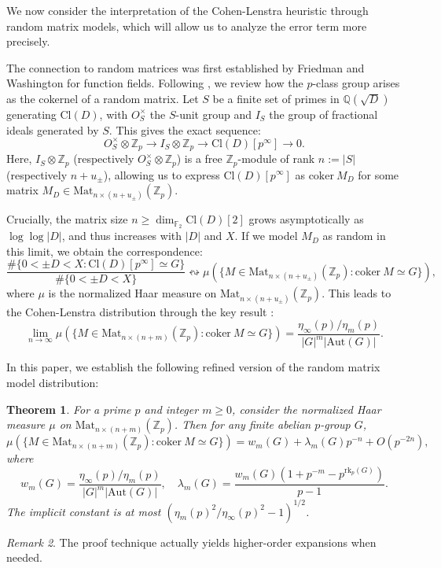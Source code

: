 \documentclass[a4]{amsart}
\newcommand{\Mat}{{\mathrm{Mat}}}
\newcommand{\Aut}{{\mathrm{Aut}}}
\newcommand{\rk}{\mathrm{rk}}
\newcommand{\Cl}{\mathrm{Cl}}
\newcommand{\coker}{\mathrm{coker~}}
\newcommand{\BF}{{\mathbb {F}}}
\newcommand{\BQ}{{\mathbb {Q}}}
\newcommand{\BZ}{{\mathbb {Z}}}
\newtheorem{theorem}{Theorem}
\theoremstyle{remark} \newtheorem{remark}[theorem]{Remark}
\begin{document}
\smallskip
We now consider the interpretation of the Cohen-Lenstra heuristic through random matrix models, which will allow us to analyze the error term more precisely.

The connection to random matrices was first established by Friedman and Washington \cite{friedman1989Distribution} for function fields. Following \cite{wood2019Random, venkatesh2011Statistics}, we review how the $p$-class group arises as the cokernel of a random matrix. Let $S$ be a finite set of primes in $\BQ(\sqrt{D})$ generating $\Cl(D)$, with $O_S^\times$ the $S$-unit group and $I_S$ the group of fractional ideals generated by $S$. This gives the exact sequence:
\[
O_S^\times\otimes \BZ_p \rightarrow I_S\otimes \BZ_p \rightarrow \Cl(D)[p^\infty] \rightarrow 0.
\]
Here, $I_S\otimes \BZ_p$ (respectively $O_S^\times\otimes \BZ_p$) is a free $\BZ_p$-module of rank $n:=|S|$ (respectively $n+u_\pm$), allowing us to express $\Cl(D)[p^\infty]$ as $\coker M_D$ for some matrix $M_D\in \Mat_{n\times (n+u_\pm)}(\BZ_p)$.

Crucially, the matrix size $n \geq \dim_{\BF_2}\Cl(D)[2]$ grows asymptotically as $\log\log |D|$, and thus increases with $|D|$ and $X$. 
If we model $M_D$ as random in this limit, we obtain the correspondence:
\begin{equation}\label{equ:cor}
\frac{\#\{0<\pm D<X: \Cl(D)[p^\infty]\simeq G\}}{\#\{0<\pm D<X\}} \leftrightsquigarrow \mu\left(\{M\in \Mat_{n\times (n+u_\pm)}(\BZ_p) : \coker M\simeq G\}\right), \tag{$\ast$}
\end{equation}
where $\mu$ is the normalized Haar measure on $\Mat_{n\times(n+u_{\pm})}(\BZ_p)$. 
This leads to the Cohen-Lenstra distribution through the key result \cite{friedman1989Distribution, wood2019Random}:
\[
\lim_{n\to \infty}\mu\left(\{M\in \Mat_{n\times (n+m)}(\BZ_p) : \coker M\simeq G\}\right) = \frac{\eta_\infty(p)/\eta_{m}(p)}{|G|^{m}|\Aut(G)|}.
\]

 

\bigskip
In this paper, we establish the following refined version of the random matrix model distribution:
\begin{theorem}\label{thm:main_thm0}
For a prime $p$ and integer $m \geq 0$, consider the normalized Haar measure $\mu$ on $\Mat_{n\times(n+m)}(\BZ_p)$. Then for any finite abelian $p$-group $G$,
\[
\mu\left(\{M \in \Mat_{n\times(n+m)}(\BZ_p) : \coker M \simeq G\}\right) = w_m(G) + \lambda_m(G)p^{-n} + O(p^{-2n}),
\]
where 
\[
w_m(G) = \frac{\eta_\infty(p)/\eta_m(p)}{|G|^m|\Aut(G)|}, \quad 
\lambda_m(G) = \frac{w_m(G)(1 + p^{-m} - p^{\rk_p(G)})}{p-1}.
\]
The implicit constant is at most $\left(\eta_m(p)^2/\eta_\infty(p)^2 - 1\right)^{1/2}$.
\end{theorem}
\begin{remark}
The proof technique actually yields higher-order expansions when needed.
\end{remark}
\end{document}
